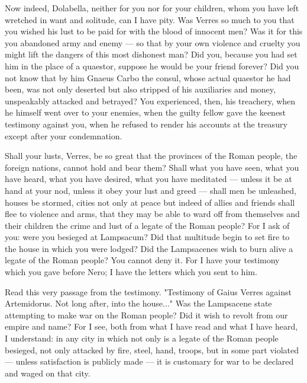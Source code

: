  Now indeed, Dolabella, neither for you nor for your children, whom you have left wretched in want and solitude, can I have pity. Was Verres so much to you that you wished his lust to be paid for with the blood of innocent men? Was it for this you abandoned army and enemy --- so that by your own violence and cruelty you might lift the dangers of this most dishonest man? Did you, because you had set him in the place of a quaestor, suppose he would be your friend forever? Did you not know that by him Gnaeus Carbo the consul, whose actual quaestor he had been, was not only deserted but also stripped of his auxiliaries and money, unspeakably attacked and betrayed? You experienced, then, his treachery, when he himself went over to your enemies, when the guilty fellow gave the keenest testimony against you, when he refused to render his accounts at the treasury except after your condemnation.

 Shall your lusts, Verres, be so great that the provinces of the Roman people, the foreign nations, cannot hold and bear them? Shall what you have seen, what you have heard, what you have desired, what you have meditated --- unless it be at hand at your nod, unless it obey your lust and greed --- shall men be unleashed, houses be stormed, cities not only at peace but indeed of allies and friends shall flee to violence and arms, that they may be able to ward off from themselves and their children the crime and lust of a legate of the Roman people? For I ask of you: were you besieged at Lampsacum? Did that multitude begin to set fire to the house in which you were lodged? Did the Lampsacenes wish to burn alive a legate of the Roman people? You cannot deny it. For I have your testimony which you gave before Nero; I have the letters which you sent to him.

 Read this very passage from the testimony. "Testimony of Gaius Verres against Artemidorus. Not long after, into the house..." Was the Lampsacene state attempting to make war on the Roman people? Did it wish to revolt from our empire and name? For I see, both from what I have read and what I have heard, I understand: in any city in which not only is a legate of the Roman people besieged, not only attacked by fire, steel, hand, troops, but in some part violated --- unless satisfaction is publicly made --- it is customary for war to be declared and waged on that city.

